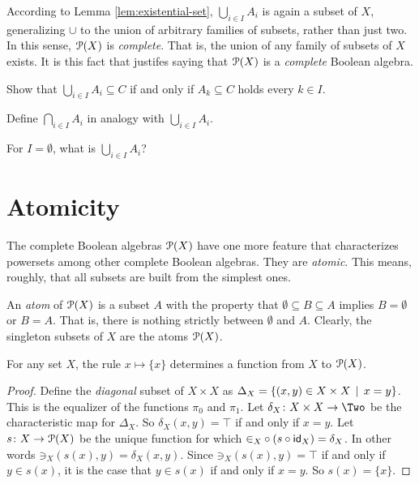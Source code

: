 According to Lemma \ref{lem:existential-set}, $\bigcup_{i\in I}A_i$ is again a subset of $X$, generalizing $\cup$ to the union of arbitrary families of subsets, rather than just two.
In this sense, ${\mathcal{P}}(X)$ is \emph{complete}.
That is, the union of any family of subsets of $X$ exists.
It is this fact that justifes saying that ${\mathcal{P}}(X)$ is a \emph{complete} Boolean algebra.

\begin{exercises}
	\begin{nextexercise}
		\item Show that $\bigcup_{i\in I}A_i\subseteq C$ if and only if $A_k\subseteq C$ holds every $k\in I$.
		\item Define $\bigcap_{i\in I}A_i$ in analogy with $\bigcup_{i\in I}A_i$.
		\item For $I=\emptyset$, what is $\bigcup_{i\in I}A_i$?
	\end{nextexercise}
\end{exercises}

\section{Atomicity}

The complete Boolean algebras ${\mathcal{P}}(X)$ have one more feature that characterizes powersets among other complete Boolean algebras.
They are \emph{atomic}. 
This means, roughly, that all subsets are built from the simplest ones.

An \emph{atom} of ${\mathcal{P}}(X)$ is a subset $A$ with the property that $\emptyset\subseteq B\subseteq A$ implies $B=\emptyset$ or $B=A$. That is, there is nothing strictly between $\emptyset$ and $A$.
Clearly, the singleton subsets of $X$ are the atoms ${\mathcal{P}}(X)$.

\begin{lemma}
	For any set $X$, the rule $x\mapsto \{x\}$ determines a function from $X$ to ${\mathcal{P}}(X)$.
	
	\begin{proof}
		Define the \emph{diagonal} subset of $X\times X$ as $\Delta_X = \{(x,y)\in X\times X \,\mid\, x= y\}$.
		This is the equalizer of the functions $\pi_0$ and $\pi_1$.
		Let $\fromto {\delta_X}{X\times X}\Two$ be the characteristic map for $\Delta_X$. So $\delta_X(x,y)=\top$ if and only if $x=y$. 
		Let ${s}\colon{X}\to{{\mathcal{P}}(X)}$ be the unique function for which ${\mathord\in}_X\circ (s\circ \textsf{id}_X)= \delta_X$.
		In other words ${\mathord\ni}_X(s(x),y)=\delta_X(x,y)$.
		Since ${\mathord\ni}_X(s(x),y) =\top$ if and only if $y\in s(x)$, it is the case that $y\in s(x)$ if and only if $x=y$.
		So $s(x) = \{x\}$. 
	\end{proof}
\end{lemma}

